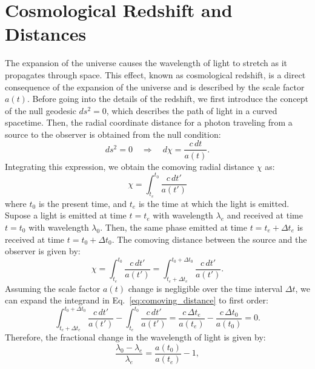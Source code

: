 \section{Cosmological Redshift and Distances}
The expansion of the universe causes the wavelength of light to stretch as it propagates through space. This effect, known as cosmological redshift, is a direct consequence of the expansion of the universe and is described by the scale factor \( a(t) \). 
Before going into the details of the redshift, we first introduce the concept of the null geodesic $ds^2 = 0$, which describes the path of light in a curved spacetime. Then, the radial coordinate distance for a photon traveling from a source to the observer is obtained from the null condition:
\begin{equation}
    ds^2 = 0 \quad \Rightarrow \quad d\chi = \frac{c \, dt}{a(t)}.
    \label{eq:null_geodesic_condition}
\end{equation}
Integrating this expression, we obtain the comoving radial distance \( \chi \) as:
\begin{equation}
    \chi = \int_{t_e}^{t_0} \frac{c \, dt'}{a(t')}
    \label{eq:comoving_radial_distance}
\end{equation}
where \( t_0 \) is the present time, and \( t_e \) is the time at which the light is emitted. Supose a light is emitted at time \( t = t_e \) with wavelength \( \lambda_e \) and received at time \( t = t_0 \) with wavelength \( \lambda_0 \). Then, the same phase emitted at time \( t = t_e + \Delta t_e \) is received at time \( t = t_0 + \Delta t_0 \).
The comoving distance between the source and the observer is given by:
\begin{equation}
    \chi = \int_{t_e}^{t_0} \frac{c \, dt'}{a(t')} = \int_{t_e + \Delta t_e}^{t_0 + \Delta t_0} \frac{c \, dt'}{a(t')}.
    \label{eq:comoving_distance}
\end{equation}
Assuming the scale factor \( a(t) \) change is negligible over the time interval \( \Delta t \), we can expand the integrand in Eq.~\eqref{eq:comoving_distance} to first order:
\begin{equation}
    \int_{t_e + \Delta t_e}^{t_0 + \Delta t_0} \frac{c \, dt'}{a(t')} - \int_{t_e}^{t_0} \frac{c \, dt'}{a(t')} = \frac{c \, \Delta t_e}{a(t_e)} - \frac{c \, \Delta t_0}{a(t_0)} = 0.
\end{equation}
Therefore, the fractional change in the wavelength of light is given by:
\begin{equation}
    \frac{\lambda_0 - \lambda_e}{\lambda_e} = \frac{a(t_0)}{a(t_e)} - 1,
    \label{eq:redshift_definition}
\end{equation}
